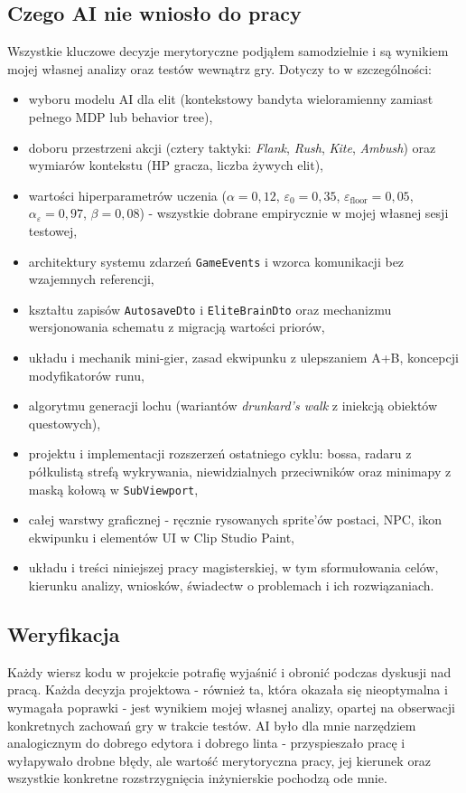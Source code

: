 \subsection*{Czego AI nie wniosło do pracy}

Wszystkie kluczowe decyzje merytoryczne podjąłem samodzielnie i są wynikiem mojej własnej analizy oraz testów wewnątrz gry. Dotyczy to w szczególności:

\begin{itemize}
    \item wyboru modelu AI dla elit (kontekstowy bandyta wieloramienny zamiast pełnego MDP lub behavior tree),
    \item doboru przestrzeni akcji (cztery taktyki: \textit{Flank}, \textit{Rush}, \textit{Kite}, \textit{Ambush}) oraz wymiarów kontekstu (HP gracza, liczba żywych elit),
    \item wartości hiperparametrów uczenia ($\alpha = 0{,}12$, $\varepsilon_0 = 0{,}35$, $\varepsilon_\text{floor} = 0{,}05$, $\alpha_\varepsilon = 0{,}97$, $\beta = 0{,}08$) - wszystkie dobrane empirycznie w mojej własnej sesji testowej,
    \item architektury systemu zdarzeń \texttt{GameEvents} i wzorca komunikacji bez wzajemnych referencji,
    \item kształtu zapisów \texttt{AutosaveDto} i \texttt{EliteBrainDto} oraz mechanizmu wersjonowania schematu z migracją wartości priorów,
    \item układu i mechanik mini-gier, zasad ekwipunku z ulepszaniem A+B, koncepcji modyfikatorów runu,
    \item algorytmu generacji lochu (wariantów \textit{drunkard's walk} z iniekcją obiektów questowych),
    \item projektu i implementacji rozszerzeń ostatniego cyklu: bossa, radaru z półkulistą strefą wykrywania, niewidzialnych przeciwników oraz minimapy z maską kołową w \texttt{SubViewport},
    \item całej warstwy graficznej - ręcznie rysowanych sprite'ów postaci, NPC, ikon ekwipunku i elementów UI w Clip Studio Paint,
    \item układu i treści niniejszej pracy magisterskiej, w tym sformułowania celów, kierunku analizy, wniosków, świadectw o problemach i ich rozwiązaniach.
\end{itemize}

\subsection*{Weryfikacja}

Każdy wiersz kodu w projekcie potrafię wyjaśnić i obronić podczas dyskusji nad pracą. Każda decyzja projektowa - również ta, która okazała się nieoptymalna i wymagała poprawki - jest wynikiem mojej własnej analizy, opartej na obserwacji konkretnych zachowań gry w trakcie testów. AI było dla mnie narzędziem analogicznym do dobrego edytora i dobrego linta - przyspieszało pracę i wyłapywało drobne błędy, ale wartość merytoryczna pracy, jej kierunek oraz wszystkie konkretne rozstrzygnięcia inżynierskie pochodzą ode mnie.

\cleardoublepage
